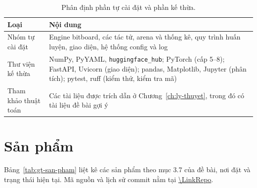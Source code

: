 \begin{table}[!htb]
  \centering\small
  \caption{Phân định phần tự cài đặt và phần kế thừa.}
  \label{tab:gt-ke-thua}
  \begin{tabularx}{\textwidth}{@{}l X@{}}
    \toprule
    \textbf{Loại} & \textbf{Nội dung} \\
    \midrule
    Nhóm tự cài đặt & Engine bitboard, các tác tử, arena và thống kê, quy trình huấn luyện, giao diện, hệ thống config và log \\
    Thư viện kế thừa & NumPy, PyYAML, \texttt{huggingface\_hub}; PyTorch (cấp 5--8); FastAPI, Uvicorn (giao diện); pandas, Matplotlib, Jupyter (phân tích); pytest, ruff (kiểm thử, kiểm tra mã) \\
    Tham khảo thuật toán & Các tài liệu được trích dẫn ở Chương~\ref{ch:ly-thuyet}, trong đó có tài liệu đề bài gợi ý \cite{liu2024alphago,russell2021aima,sutton2018rl} \\
    \bottomrule
  \end{tabularx}
\end{table}

\section{Sản phẩm}
\label{sec:gt-san-pham}
Bảng~\ref{tab:gt-san-pham} liệt kê các sản phẩm theo mục 3.7 của đề bài, nơi đặt và trạng thái hiện tại. Mã nguồn và lịch sử commit nằm tại \url{\LinkRepo}.

